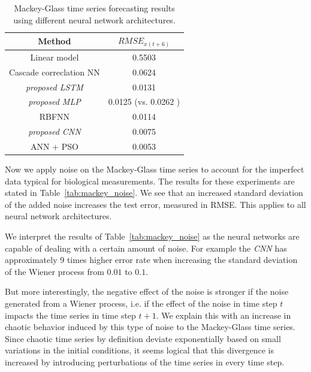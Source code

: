 \begin{table}
    \centering
    \begin{tabular}{c|c}
        Method                         & $RMSE_{x(t+6)}$                          \\
        \hline
        Linear model                   & 0.5503                                   \\
        Cascade correclation NN        & 0.0624                                   \\
        \textit{proposed LSTM}         & 0.0131                                   \\
        \textit{proposed MLP}          & 0.0125 (vs. 0.0262 \cite{lopez2016}) \\
        RBFNN                          & 0.0114                                   \\
        \textit{proposed CNN}          & 0.0075                                   \\
        ANN + PSO \cite{lopez2016} & 0.0053                                   \\
    \end{tabular}
    \caption{Mackey-Glass time series forecasting results using different neural
        network architectures.}
    \label{tab:mackey_results}
\end{table}

Now we apply noise on the Mackey-Glass time series to account for the imperfect
data typical for biological measurements. The results for these
experiments are stated in Table~\ref{tab:mackey_noise}. We see that an increased
standard deviation of the added noise increases the test error, measured in
RMSE. This applies to all neural network architectures.

We interpret the results of Table~\ref{tab:mackey_noise}
as the neural networks are capable of dealing with a certain
amount of noise. For example the \emph{CNN} has
approximately 9 times higher error rate when increasing the standard 
deviation of the Wiener process from $0.01$ to $0.1$.

But more interestingly,
the negative effect of the noise is stronger if the noise generated 
from a Wiener process, i.e. if
the effect of the noise in time step $t$ impacts the time series in time step
$t + 1$. We explain this with an increase in chaotic behavior induced by this
type of noise to the Mackey-Glass time series. Since chaotic time series by
definition deviate exponentially based on small variations in the initial
conditions, it seems logical that this divergence is increased by introducing
perturbations of the time series in every time step.

